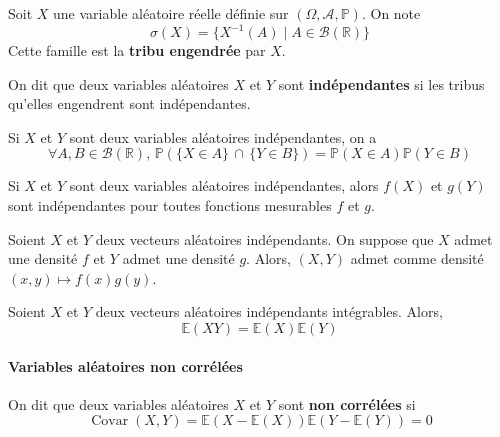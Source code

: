 
  \begin{definition}
    Soit $X$ une variable aléatoire réelle définie sur $(\Omega, \mathcal{A}, \mathbb{P})$. On note
    \[ \sigma(X) = \{ X^{-1}(A) \mid A \in \mathcal{B}(\mathbb{R}) \} \]
    Cette famille est la \textbf{tribu engendrée} par $X$.
  \end{definition}

  \begin{definition}
    On dit que deux variables aléatoires $X$ et $Y$ sont \textbf{indépendantes} si les tribus qu'elles engendrent sont indépendantes.
  \end{definition}

  \begin{example}
    Si $X$ et $Y$ sont deux variables aléatoires indépendantes, on a
    \[ \forall A, B \in \mathcal{B}(\mathbb{R}), \, \mathbb{P}(\{ X \in A \} \, \cap \, \{ Y \in B \}) = \mathbb{P}(X \in A) \mathbb{P}(Y \in B) \]
  \end{example}

  \begin{proposition}
    Si $X$ et $Y$ sont deux variables aléatoires indépendantes, alors $f(X)$ et $g(Y)$ sont indépendantes pour toutes fonctions mesurables $f$ et $g$.
  \end{proposition}


  \begin{proposition}
    Soient $X$ et $Y$ deux vecteurs aléatoires indépendants. On suppose que $X$ admet une densité $f$ et $Y$ admet une densité $g$. Alors, $(X,Y)$ admet comme densité $(x,y) \mapsto f(x)g(y)$.
  \end{proposition}


  \begin{proposition}
    Soient $X$ et $Y$ deux vecteurs aléatoires indépendants intégrables. Alors,
    \[ \mathbb{E}(XY) = \mathbb{E}(X) \mathbb{E}(Y) \]
  \end{proposition}

  \paragraph{Variables aléatoires non corrélées}


  \begin{definition}
    On dit que deux variables aléatoires $X$ et $Y$ sont \textbf{non corrélées} si
    \[ \operatorname{Covar}(X,Y) = \mathbb{E}(X - \mathbb{E}(X))\mathbb{E}(Y - \mathbb{E}(Y)) = 0 \]
  \end{definition}

